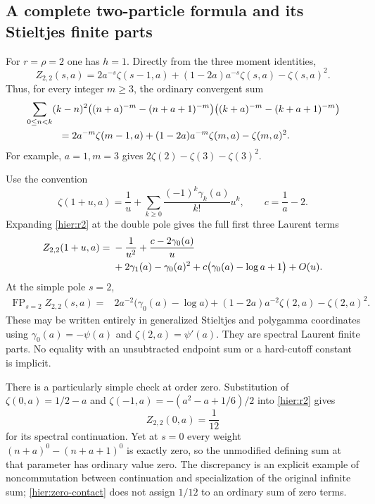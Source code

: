 \documentclass[11pt]{article}
\theoremstyle{definition}
\theoremstyle{remark}
\numberwithin{equation}{section}
\begin{document}
\subsection{A complete two-particle formula and its Stieltjes finite parts}

For $r=\rho=2$ one has $h=1$.  Directly from the three moment
identities,
\begin{equation}\label{hier:r2}
 \boxed{\displaystyle
 Z_{2,2}(s,a)=2a^{-s}\zeta(s-1,a)
        +(1-2a)a^{-s}\zeta(s,a)-\zeta(s,a)^2.}
\end{equation}
Thus, for every integer $m\ge3$, the ordinary convergent sum
\begin{align}\label{hier:r2-sum}
 &\sum_{0\le n<k}(k-n)^2
 \bigl((n+a)^{-m}-(n+a+1)^{-m}\bigr)
 \bigl((k+a)^{-m}-(k+a+1)^{-m}\bigr)\notag\\
 &\hspace{12mm}=2a^{-m}\zeta(m-1,a)
            +(1-2a)a^{-m}\zeta(m,a)-\zeta(m,a)^2.
\end{align}
For example, $a=1,m=3$ gives
$2\zeta(2)-\zeta(3)-\zeta(3)^2$.

Use the convention
\[
 \zeta(1+u,a)=\frac1u+
    \sum_{k\ge0}\frac{(-1)^k\gamma_k(a)}{k!}u^k,
 \qquad c=\frac1a-2.
\]
Expanding \eqref{hier:r2} at the double pole gives the full first
three Laurent terms
\begin{align}\label{hier:r2-s1}
 Z_{2,2}(1+u,a)
 ={}&-\frac1{u^2}+\frac{c-2\gamma_0(a)}u\notag\\
 &+2\gamma_1(a)-\gamma_0(a)^2
       +c\bigl(\gamma_0(a)-\log a+1\bigr)+O(u).
\end{align}
At the simple pole $s=2$,
\begin{align}\label{hier:r2-s2}
 \operatorname{FP}_{s=2}Z_{2,2}(s,a)
 ={}&2a^{-2}\bigl(\gamma_0(a)-\log a\bigr)
 +(1-2a)a^{-2}\zeta(2,a)-\zeta(2,a)^2.
\end{align}
These may be written entirely in generalized Stieltjes and polygamma
coordinates using $\gamma_0(a)=-\psi(a)$ and $\zeta(2,a)=\psi'(a)$.
They are spectral Laurent finite parts.  No equality with an
unsubtracted endpoint sum or a hard-cutoff constant is implicit.

There is a particularly simple check at order zero. Substitution of
$\zeta(0,a)=1/2-a$ and
$\zeta(-1,a)=-(a^2-a+1/6)/2$ into \eqref{hier:r2} gives
\begin{equation}\label{hier:zero-contact}
                  Z_{2,2}(0,a)=\frac1{12}
\end{equation}
for its spectral continuation. Yet at $s=0$ every weight
$(n+a)^0-(n+a+1)^0$ is exactly zero, so the unmodified defining
sum at that parameter has ordinary value zero. The discrepancy is
an explicit example of noncommutation between continuation and
specialization of the original infinite sum; \eqref{hier:zero-contact}
does not assign $1/12$ to an ordinary sum of zero terms.
\end{document}
